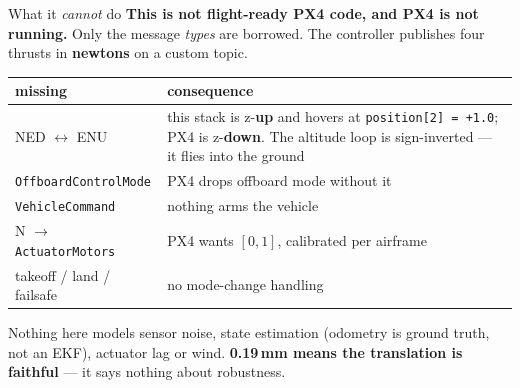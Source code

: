 \documentclass[aspectratio=169,11pt]{beamer}
\newcommand{\cue}[1]{\textbf{\color{keyc}#1}}
\begin{document}
\begin{frame}[fragile]{What it \emph{cannot} do}
  \cue{This is not flight-ready PX4 code, and PX4 is not running.} Only the
  message \emph{types} are borrowed. The controller publishes four thrusts in
  \textbf{newtons} on a custom topic.

  \vspace{0.25cm}
  \begin{center}
  \footnotesize
  \begin{tabular}{@{}lp{6.0cm}@{}}
    \toprule
    missing & consequence\\
    \midrule
    NED $\leftrightarrow$ ENU & this stack is z-\textbf{up} and hovers at
      \texttt{position[2] = +1.0}; PX4 is z-\textbf{down}. The altitude loop is
      sign-inverted --- it flies into the ground\\
    \texttt{OffboardControlMode} & PX4 drops offboard mode without it\\
    \texttt{VehicleCommand} & nothing arms the vehicle\\
    N $\to$ \texttt{ActuatorMotors} & PX4 wants $[0,1]$, calibrated per airframe\\
    takeoff / land / failsafe & no mode-change handling\\
    \bottomrule
  \end{tabular}
  \end{center}

  \vspace{0.2cm}
  {\footnotesize Nothing here models sensor noise, state estimation (odometry is
  ground truth, not an EKF), actuator lag or wind. \cue{0.19\,mm means the
  translation is faithful} --- it says nothing about robustness.}
\end{frame}
\end{document}
